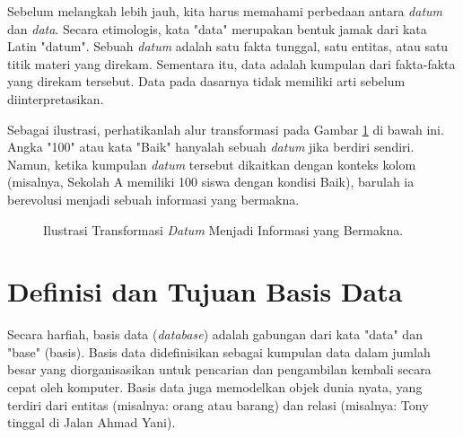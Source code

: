 \documentclass[11pt,a4paper]{article}
\begin{document}
Sebelum melangkah lebih jauh, kita harus memahami perbedaan antara \textit{datum} dan \textit{data}. Secara etimologis, kata "data" merupakan bentuk jamak dari kata Latin "datum". Sebuah \textit{datum} adalah satu fakta tunggal, satu entitas, atau satu titik materi yang direkam. Sementara itu, data adalah kumpulan dari fakta-fakta yang direkam tersebut. Data pada dasarnya tidak memiliki arti sebelum diinterpretasikan.

Sebagai ilustrasi, perhatikanlah alur transformasi pada Gambar \ref{fig:datum} di bawah ini. Angka "100" atau kata "Baik" hanyalah sebuah \textit{datum} jika berdiri sendiri. Namun, ketika kumpulan \textit{datum} tersebut dikaitkan dengan konteks kolom (misalnya, Sekolah A memiliki 100 siswa dengan kondisi Baik), barulah ia berevolusi menjadi sebuah informasi yang bermakna.

\begin{figure}[H]
	\centering
	\caption{Ilustrasi Transformasi \textit{Datum} Menjadi Informasi yang Bermakna.}
	\label{fig:datum}
\end{figure}

\section{Definisi dan Tujuan Basis Data}

Secara harfiah, basis data (\textit{database}) adalah gabungan dari kata "data" dan "base" (basis). Basis data didefinisikan sebagai kumpulan data dalam jumlah besar yang diorganisasikan untuk pencarian dan pengambilan kembali secara cepat oleh komputer. Basis data juga memodelkan objek dunia nyata, yang terdiri dari entitas (misalnya: orang atau barang) dan relasi (misalnya: Tony tinggal di Jalan Ahmad Yani).
\end{document}

